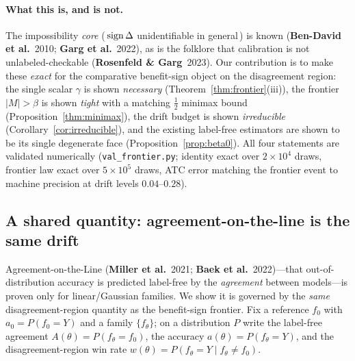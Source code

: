 \paragraph{What this is, and is not.} The impossibility \emph{core}
(\,$\operatorname{sign}\Delta$ unidentifiable in general\,) is known
(\textbf{Ben-David et al.}\ 2010; \textbf{Garg et al.}\ 2022), as is the folklore that
calibration is not unlabeled-checkable (\textbf{Rosenfeld \& Garg}\ 2023). Our contribution is to make these
\emph{exact} for the comparative benefit-sign object on the disagreement region: the single
scalar $\gamma$ is shown \emph{necessary} (Theorem~\ref{thm:frontier}(iii)), the frontier
$|M|>\beta$ is shown \emph{tight} with a matching $\tfrac12$ minimax bound
(Proposition~\ref{thm:minimax}), the drift budget is shown \emph{irreducible}
(Corollary~\ref{cor:irreducible}), and the existing label-free estimators are shown to be
its single degenerate face (Proposition~\ref{prop:beta0}). All four statements are validated
numerically (\texttt{val\_frontier.py}; identity exact over $2{\times}10^4$ draws, frontier
law exact over $5{\times}10^5$ draws, ATC error matching the frontier event to machine
precision at drift levels $0.04$--$0.28$).

\subsection{A shared quantity: agreement-on-the-line is the same drift}\label{sec:agl}
Agreement-on-the-Line (\textbf{Miller et al.}\ 2021; \textbf{Baek et al.}\ 2022)---that
out-of-distribution accuracy is predicted label-free by the \emph{agreement} between
models---is proven only for linear/Gaussian families. We show it is governed by the
\emph{same} disagreement-region quantity as the benefit-sign frontier. Fix a reference $f_0$
with $a_0=P(f_0{=}Y)$ and a family $\{f_\theta\}$; on a distribution $P$ write the label-free
agreement $A(\theta)=P(f_\theta{=}f_0)$, the accuracy $a(\theta)=P(f_\theta{=}Y)$, and the
disagreement-region win rate $w(\theta)=P(f_\theta{=}Y\mid f_\theta\neq f_0)$.

